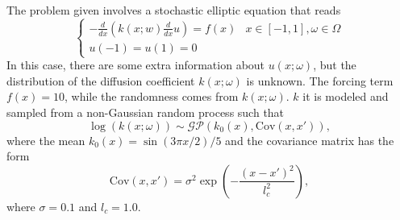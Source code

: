 \documentclass[11pt,a4paper]{article}
\begin{document}
The problem given involves a stochastic elliptic equation that reads
\begin{equation}
    \begin{cases}
        \displaystyle -\frac{d}{dx} \left( k(x;w)\frac{d}{dx}u \right) = f(x) & x \in [-1,1], \omega \in \Omega \\
        u(-1) = u(1) = 0
    \end{cases}
    \label{inverse_pbl}
\end{equation}
In this case, there are some extra information about \(u(x;\omega)\), but the distribution of the diffusion coefficient \(k(x;\omega)\) is unknown. The forcing term \(f(x) = 10\), while the randomness comes from \(k(x;\omega)\). \(k\) it is modeled and sampled from a non-Gaussian random process such that 
\[
    \log(k(x;\omega)) \sim \mathcal{GP}(k_0(x), \text{Cov}(x, x')),
\]
where the mean \(k_0(x) = \sin({3\pi x}/2)/5\) and the covariance matrix has the form 
\[
    \text{Cov}(x, x') = \sigma^2 \exp\left( - \frac{(x-x')^2}{l_c^2} \right),
\]
where \(\sigma = 0.1\) and \(l_c= 1.0\).
\end{document}
